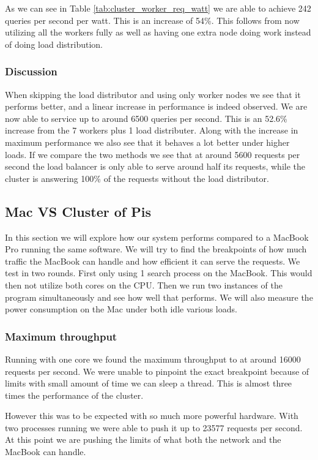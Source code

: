 As we can see in Table \ref{tab:cluster_worker_req_watt} we are able to achieve 242 queries per second per watt.
This is an increase of 54\%.
This follows from now utilizing all the workers fully as well as having one extra node doing work instead of doing load distribution.

\subsubsection{Discussion}
When skipping the load distributor and using only worker nodes we see that it performs better, and a linear increase in performance is indeed observed.
We are now able to service up to around 6500 queries per second. This is an 52.6\% increase from the 7 workers plus 1 load distributer.
Along with the increase in maximum performance we also see that it behaves a lot better under higher loads.
If we compare the two methods we see that at around 5600 requests per second the load balancer is only able to serve around half its requests, while the cluster is answering 100\% of the requests without the load distributor.

\subsection{Mac VS Cluster of Pis}
In this section we will explore how our system performs compared to a MacBook Pro running the same software. We will try to find the breakpoints of how much traffic the MacBook can handle and how efficient it can serve the requests. We test in two rounds. First only using 1 search process on the MacBook. This would then not utilize both cores on the CPU. Then we run two instances of the program simultaneously and see how well that performs. We will also measure the power consumption on the Mac under both idle various loads.

\subsubsection{Maximum throughput}
Running with one core we found the maximum throughput to at around 16000 requests per second. We were unable to pinpoint the exact breakpoint because of limits with small amount of time we can sleep a thread. This is almost three times the performance of the cluster.

However this was to be expected with so much more powerful hardware. With two processes running we were able to push it up to 23577 requests per second. At this point we are pushing the limits of what both the network and the MacBook can handle.

